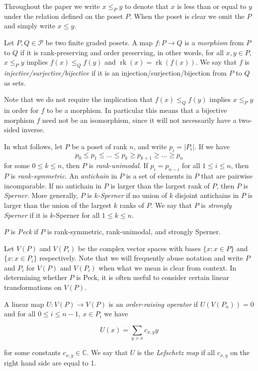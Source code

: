 \documentclass[smallextended, envcountsame, numbook]{svjour3}
\numberwithin{equation}{section}
\newcommand\rk{\operatorname{rk}}
\begin{document}
Throughout the paper we write $x\le_P y$ to denote that $x$ is less than or equal to $y$ under the relation defined on the poset $P$.  When the poset is clear we omit the $P$ and simply write $x\le y$.  

Let $P, Q \in \mathcal P$ be two finite graded posets.  A map $f\colon P\rightarrow Q$ is a \textit{morphism} from $P$ to $Q$ if it is rank-preserving and order preserving, in other words, for all $x,y\in P$, $x\le_P y $ implies $f(x)\le_Q f(y)$ and $\rk(x) = \rk(f(x))$.  We say that $f$ is \textit{injective/surjective/bijective} if it is an injection/surjection/bijection from $P$ to $Q$ as sets.

\begin{remark}\label{rem:bijective_morphism_not_isomorphism}
Note that we do not require the implication that $f(x)\le_Q f(y)$ implies $x\le_P y$ in order for $f$ to be a morphism.  In particular this means that a bijective morphism $f$ need not be an isomorphism, since it will not necessarily have a two-sided inverse.  
\end{remark}


In what follows, let $P$ be a poset of rank $n$, and write $p_i = |P_i|$.  If we have
$$p_0\le p_1\le \ldots \le p_k \ge p_{k+1} \ge\ldots \ge p_n$$
for some $0\le k\le n$, then $P$ is \textit{rank-unimodal}. If $p_i = p_{n-i}$ for all $1\le i\le n$, then $P$ is \textit{rank-symmetric}.  An \textit{antichain} in $P$ is a set of elements in $P$ that are pairwise incomparable.  If no antichain in $P$ is larger than the largest rank of $P$, then $P$ is \textit{Sperner}.  More generally, $P$ is \textit{$k$-Sperner} if no union of $k$ disjoint antichains in $P$ is larger than the union of the largest $k$ ranks of $P$. We say that $P$ is \textit{strongly Sperner} if it is $k$-Sperner for all $1\le k\le n$.

\begin{definition}
$P$ is \textit{Peck} if $P$ is rank-symmetric, rank-unimodal, and strongly Sperner.
\end{definition}


Let $V(P)$ and $V(P_i)$ be the complex vector spaces with bases $\{x :x\in P\}$ and $\{x :x\in P_i\}$ respectively.  Note that we will frequently abuse notation and write $P$ and $P_i$ for $V(P)$ and $V(P_i)$ when what we mean is clear from context.  In determining whether $P$ is Peck, it is often useful to consider certain linear transformations on $V(P)$.

\begin{definition}
\label{defn:lefschetz}
A linear map $U\colon V(P)\rightarrow V(P)$ is an \textit{order-raising operator} if $U(V(P_n)) = 0$ and for all $0\le i\le n-1$, $x\in P_i$ we have

$$U(x) = \sum_{y\gtrdot x} c_{x,y}y$$

\noindent for some constants $c_{x,y}\in \mathbb{C}$.  We say that $U$ is the \textit{Lefschetz map} if all $c_{x,y}$ on the right hand side are equal to 1.
\end{definition}
\end{document}
